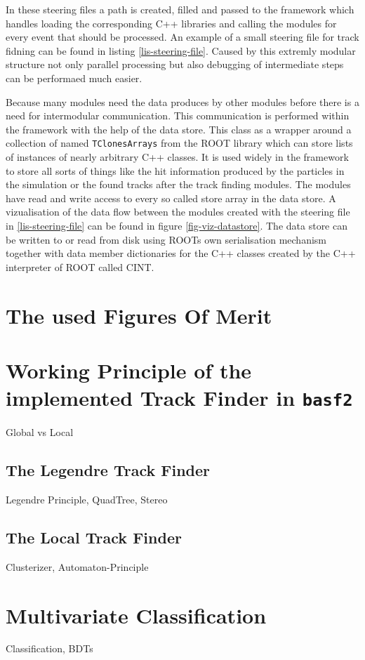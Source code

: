 In these steering files a path is created, filled and passed to the framework which handles loading the corresponding C++ libraries and calling the modules for every event that should be processed. An example of a small steering file for track fidning can be found in listing \ref{lis-steering-file}.  Caused by this extremly modular structure not only parallel processing but also debugging of intermediate steps can be performaed much easier.

Because many modules need the data produces by other modules before there is a need for intermodular communication. This communication is performed within the framework with the help of the data store. This class as a wrapper around a collection of named \texttt{TClonesArrays} from the ROOT library  which can store lists of instances of nearly arbitrary C++ classes. It is used widely in the framework to store all sorts of things like the hit information produced by the particles in the simulation or the found tracks after the track finding modules. The modules have read and write access to every so called store array in the data store. A vizualisation of the data flow between the modules created with the steering file in \ref{lis-steering-file} can be found in figure \ref{fig-viz-datastore}. The data store can be written to or read from disk using ROOTs own serialisation mechanism together with data member dictionaries for the C++ classes created by the C++ interpreter of ROOT called CINT.

\section{The used Figures Of Merit}



\section{Working Principle of the implemented Track Finder in \texttt{basf2}}
Global vs Local
\subsection{The Legendre Track Finder}
Legendre Principle, QuadTree, Stereo
\subsection{The Local Track Finder}
Clusterizer, Automaton-Principle
\section{Multivariate Classification}
Classification, BDTs